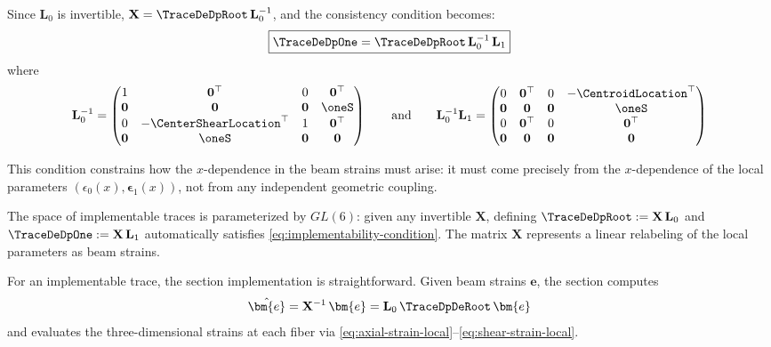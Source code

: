 Since $\mathbf{L}_0$ is invertible, $\mathbf{X} = \TraceDeDpRoot\,\mathbf{L}_0^{-1}$, 
and the consistency condition becomes:
\begin{equation}
\boxed{\TraceDeDpOne = \TraceDeDpRoot\,\mathbf{L}_0^{-1}\,\mathbf{L}_1}
\label{eq:implementability-condition}
\end{equation}
where
$$
\mathbf{L}_0^{-1} = \begin{pmatrix}
1 & \mathbf{0}^\top & 0 & \mathbf{0}^\top \\
\mathbf{0} & \mathbf{0} & \mathbf{0} & \oneS \\
0 & -\CenterShearLocation^\top & 1 & \mathbf{0}^\top \\
\mathbf{0} & \oneS & \mathbf{0} & \mathbf{0}
\end{pmatrix}
\qquad \text{and}\qquad
\mathbf{L}_0^{-1}\mathbf{L}_1 = \begin{pmatrix}
0 & \mathbf{0}^\top & 0 & -\CentroidLocation^\top \\
\mathbf{0} & \mathbf{0} & \mathbf{0} & \oneS\\
0 & \mathbf{0}^\top & 0 & \mathbf{0}^\top \\
\mathbf{0} & \mathbf{0} & \mathbf{0} & \mathbf{0} \\
\end{pmatrix}$$

This condition constrains how the $x$-dependence in the beam strains must 
arise: it must come precisely from the $x$-dependence of the local parameters 
$(\epsilon_0(x), \bm{\epsilon}_1(x))$, not from any independent geometric coupling.

The space of implementable traces is parameterized by $GL(6)$: given any 
invertible $\mathbf{X}$, defining $\TraceDeDpRoot := \mathbf{X}\,\mathbf{L}_0$ 
and $\TraceDeDpOne := \mathbf{X}\,\mathbf{L}_1$ automatically satisfies 
\eqref{eq:implementability-condition}. The matrix $\mathbf{X}$ represents a 
linear relabeling of the local parameters as beam strains.

For an implementable trace, the section implementation is straightforward. 
Given beam strains $\bm{e}$, the section computes
\begin{equation}
\hat{\bm{e}} = \mathbf{X}^{-1}\,\bm{e} = \mathbf{L}_0\,\TraceDpDeRoot\,\bm{e}
\label{eq:q-recovery}
\end{equation}
and evaluates the three-dimensional strains at each fiber via 
\eqref{eq:axial-strain-local}--\eqref{eq:shear-strain-local}.
